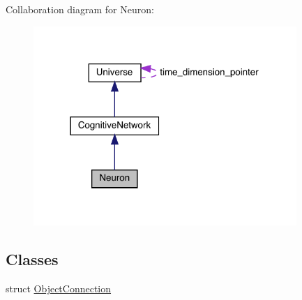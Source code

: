 Collaboration diagram for Neuron\+:\nopagebreak
\begin{figure}[H]
\begin{center}
\leavevmode
\includegraphics[width=283pt]{class_neuron__coll__graph}
\end{center}
\end{figure}
\subsection*{Classes}
\begin{DoxyCompactItemize}
\item 
struct \mbox{\hyperlink{struct_neuron_1_1_object_connection}{Object\+Connection}}
\end{DoxyCompactItemize}
